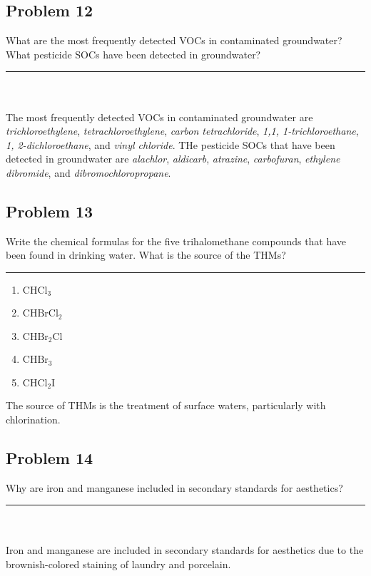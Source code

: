\subsection*{Problem 12}
What are the most frequently detected VOCs in contaminated groundwater? What pesticide SOCs have been detected in groundwater?
\\\rule{5cm}{1pt}
\\\\The most frequently detected VOCs in contaminated groundwater are \textit{trichloroethylene}, \textit{tetrachloroethylene}, \textit{carbon tetrachloride}, \textit{1,1, 1-trichloroethane}, \textit{1, 2-dichloroethane}, and \textit{vinyl chloride}. THe pesticide SOCs that have been detected in groundwater are \textit{alachlor}, \textit{aldicarb}, \textit{atrazine}, \textit{carbofuran}, \textit{ethylene dibromide}, and \textit{dibromochloropropane}.
\newpage
\subsection*{Problem 13}
Write the chemical formulas for the five trihalomethane compounds that have been found in drinking water. What is the source of the THMs?
\\\rule{5cm}{1pt}
\begin{enumerate}
    \item \(\text{CHCl}_3\)
    \item \(\text{CHBrCl}_2\)
    \item \(\text{CHBr}_2\text{Cl}\)
    \item \(\text{CHBr}_3\)
    \item \(\text{CHCl}_2\text{I}\)
\end{enumerate}
The source of THMs is the treatment of surface waters, particularly with chlorination. 
\subsection*{Problem 14}
Why are iron and manganese included in secondary standards for aesthetics?
\\\rule{5cm}{1pt}
\\\\Iron and manganese are included in secondary standards for aesthetics due to the brownish-colored staining of laundry and porcelain.

